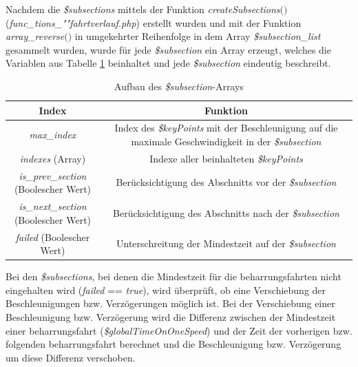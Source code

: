 Nachdem die \textit{\$subsections} mittels der Funktion \textit{createSubsections$($$)$} (\textit{func\_tions\_""fahrt\-ver\-lauf.php}) erstellt wurden und mit der Funktion \textit{array\_reverse$($$)$} in umgekehrter Reihenfolge in dem Array \textit{\$subsection\_list} gesammelt wurden, wurde für jede \textit{\$subsection} ein Array erzeugt, welches die Variablen aus Tabelle \ref{table:subsection} beinhaltet und jede \textit{\$subsection} eindeutig beschreibt.
\begin{table}
\begin{center}
\renewcommand{\arraystretch}{1.2}
\begin{tabular}{c|c}
Index & Funktion \\ \hline
\textit{max\_index}                 	&  	\makecell{Index des \textit{\$keyPoints} mit der Beschleunigung auf die\\maximale Geschwindigkeit in der \textit{\$subsection}}     \\ \hline
\textit{indexes} (Array)                 		&    	Indexe aller beinhalteten \textit{\$keyPoints}                  \\ \hline
\makecell{\textit{is\_prev\_section}\\(Boolescher Wert)}           	&   	Berücksichtigung des Abschnitts vor der \textit{\$subsection}     \\ \hline
\makecell{\textit{is\_next\_section}\\(Boolescher Wert)}           	&     	Berücksichtigung des Abschnitts nach der \textit{\$subsection}                 \\ \hline
\textit{failed} (Boolescher Wert)             & Unterschreitung der Mindestzeit auf der \textit{\$subsection}     \\ 
\end{tabular}
\renewcommand{\arraystretch}{1}
\caption{Aufbau des \textit{\$subsection}-Arrays}
\label{table:subsection}
\end{center}
\end{table}

Bei den \textit{\$subsections}, bei denen die Mindestzeit für die \Gls{beharrungsfahrt}en nicht eingehalten wird (\textit{failed} == \textit{true}), wird überprüft, ob eine Verschiebung der Beschleunigungen bzw. Verzögerungen möglich ist. Bei der Verschiebung einer Beschleunigung bzw. Verzögerung wird die Differenz zwischen der Mindestzeit einer \Gls{beharrungsfahrt} (\textit{\$global\-Time\-On\-One\-Speed}) und der Zeit der vorherigen bzw. folgenden \Gls{beharrungsfahrt} berechnet und die Beschleunigung bzw. Verzögerung um diese Differenz verschoben.

